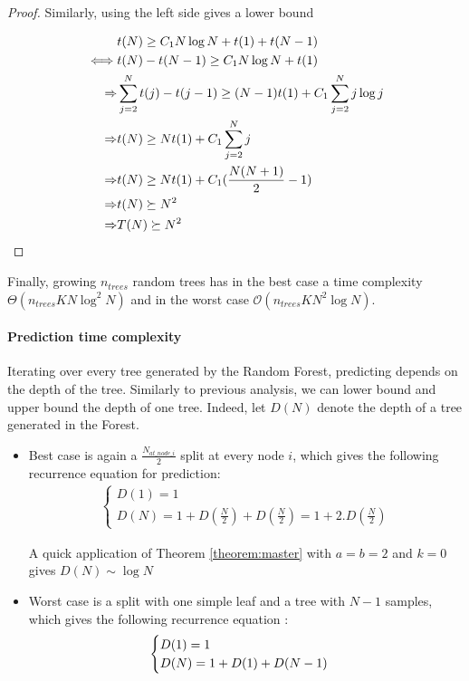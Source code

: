 \documentclass[english,11pt,openany]{article}
\theoremstyle{definition}
\newcommand{\bigO}{\mathcal{O}}
\theoremstyle{plain}
\theoremstyle{definition}
\begin{document}
\begin{appendices}
\begin{proof}
			Similarly, using the left side gives a lower bound 
			
			\begin{align}
			& t(N) \geq C_1 N\log N + t(1) + t(N-1)\notag \\
			\iff &  t(N) - t(N-1) \geq C_1 N\log N + t(1) \notag\\
			\Rightarrow & \sum_{j=2}^{N}  t(j) - t(j-1) \geq (N-1)t(1) + C_1\sum_{j=2}^{N}j \log j \notag\\
			\Rightarrow & t(N) \geq N t(1) + C_1 \sum_{j=2}^{N}j \notag\\
			\Rightarrow & t(N) \geq Nt(1) + C_1 (\frac{N(N +1)}{2} - 1)\notag \\
			\Rightarrow & t(N) \succeq N^2 \notag \\
			\Rightarrow & T(N) \succeq N^2 \notag
			\end{align}
			
		\end{proof}
		
		Finally, growing $n_{trees}$ random trees has in the best case a time complexity $\Theta(n_{trees}KN\log^2 N)$ and in the worst case $\bigO (n_{trees} K N^2 \log N)$.
		
		\paragraph{Prediction time complexity}
		
		Iterating over every tree generated by the Random Forest, predicting depends on the depth of the tree. 
		Similarly to previous analysis, we can lower bound and upper bound the depth of one tree. 
		Indeed, let $D(N)$ denote the depth of a tree generated in the Forest. 
		
		\begin{itemize}
			\item 
			Best case is again a $\frac{N_{at\_node\_i}}{2}$ split at every node $i$,  which gives the following recurrence equation for prediction: 
			\begin{align}
			\begin{cases}
			D(1) = 1 \\
			D(N) = 1 + D(\frac{N}{2}) + D(\frac{N}{2}) = 1 + 2.D(\frac{N}{2})
			\end{cases}
			\end{align}
			
			A quick application of Theorem \ref{theorem:master} with $a=b=2$ and $k=0$ gives $D(N)\sim \log N$
			
			\item Worst case is a split with one simple leaf and a tree with $N-1$ samples, which gives the following recurrence equation : 
			\begin{align}
			\begin{cases}
			D(1) = 1 \\
			D(N) = 1 + D(1) + D(N-1) \notag
			\end{cases}
			\end{align}
			

\end{itemize}
\end{appendices}
\end{document}
